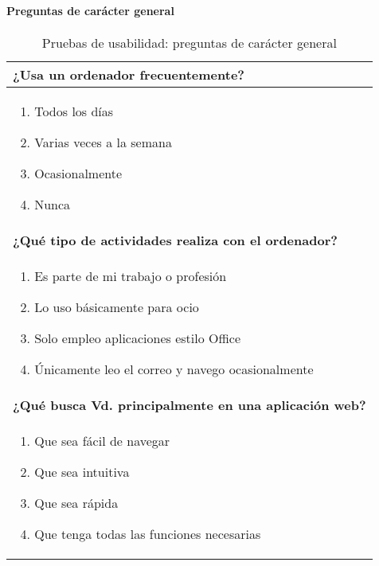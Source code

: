 \paragraph*{Preguntas de carácter general}
\begin{table}[H]
\centering
\caption{Pruebas de usabilidad: preguntas de carácter general}
\begin{tabular}{p{36em}}
\toprule
\rowcolor[rgb]{ .949,  .949,  .949} \textbf{¿Usa un ordenador frecuentemente?} \\ \midrule
\vspace{-4mm}
\begin{enumerate}
\item Todos los días
\item Varias veces a la semana
\item Ocasionalmente
\item Nunca
\end{enumerate} \\ \midrule
\rowcolor[rgb]{ .949,  .949,  .949} \textbf{¿Qué tipo de actividades realiza con el ordenador?} \\ \midrule
\vspace{-4mm}
\begin{enumerate}
\item Es parte de mi trabajo o profesión
\item Lo uso básicamente para ocio
\item Solo empleo aplicaciones estilo Office
\item Únicamente leo el correo y navego ocasionalmente
\end{enumerate} \\ \midrule
\rowcolor[rgb]{ .949,  .949,  .949} \textbf{¿Qué busca Vd. principalmente en una aplicación web?} \\ \midrule
\vspace{-4mm}
\begin{enumerate}
\item Que sea fácil de navegar
\item Que sea intuitiva
\item Que sea rápida
\item Que tenga todas las funciones necesarias
\end{enumerate} \\ \bottomrule
\end{tabular}
\end{table}

